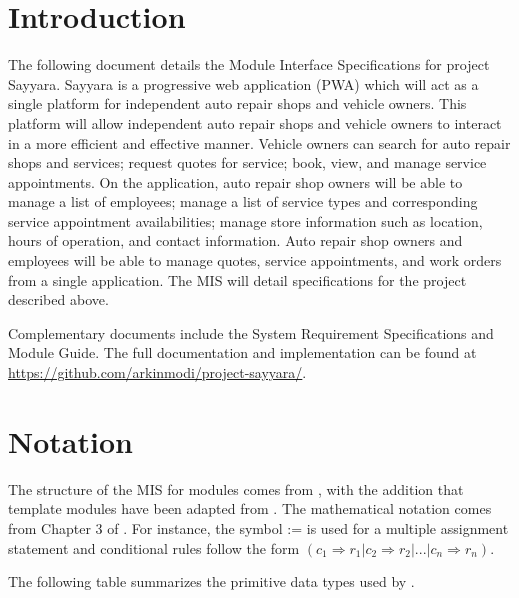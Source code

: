 \documentclass[12pt, titlepage]{article}
\begin{document}
\listoffigures

\newpage


\section{Introduction}

The following document details the Module Interface Specifications for project Sayyara. Sayyara is
a progressive web application (PWA) which will act as a single platform for independent auto repair
shops and vehicle owners. This platform will allow independent auto repair shops and vehicle owners
to interact in a more efficient and effective manner. Vehicle owners can search for auto repair
shops and services; request quotes for service; book, view, and manage service appointments. On the
application, auto repair shop owners will be able to manage a list of employees; manage a list of
service types and corresponding service appointment availabilities; manage store information such
as location, hours of operation, and contact information. Auto repair shop owners and employees
will be able to manage quotes, service appointments, and work orders from a single application. The
MIS will detail specifications for the project described above.

Complementary documents include the System Requirement Specifications and Module Guide. The full
documentation and implementation can be found at
\url{https://github.com/arkinmodi/project-sayyara/}.

\section{Notation}


The structure of the MIS for modules comes from \citet{HoffmanAndStrooper1995}, with the addition
that template modules have been adapted from \cite{GhezziEtAl2003}. The mathematical notation comes
from Chapter 3 of \citet{HoffmanAndStrooper1995}. For instance, the symbol := is used for a
multiple assignment statement and conditional rules follow the form $(c_1 \Rightarrow r_1 | c_2
	\Rightarrow r_2 | ... | c_n \Rightarrow r_n )$.

The following table summarizes the primitive data types used by \progname.
\end{document}
